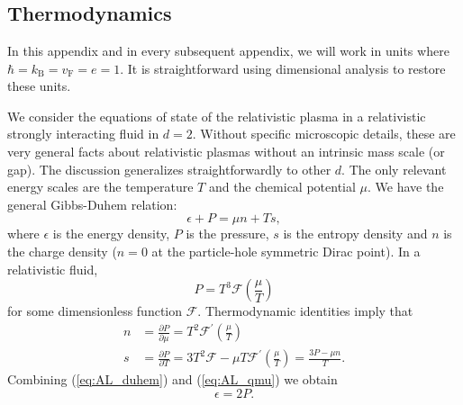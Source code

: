 \chapter{}
\label{Appendix}
\section{Thermodynamics}\label{appthermo}
In this appendix and in every subsequent appendix, we will work in units where $\hbar=k_{\mathrm{B}}=v_{\mathrm{F}}=e=1$.     It is straightforward using dimensional analysis to restore these units.  

We consider the equations of state of the relativistic plasma in a relativistic strongly interacting fluid in $d=2$.    Without specific microscopic details, these are very general facts about relativistic plasmas without an intrinsic mass scale (or gap).  The discussion generalizes straightforwardly to other $d$.    The only relevant energy scales are the temperature $T$ and the chemical potential $\mu$.     We have the general Gibbs-Duhem relation:\begin{equation} \label{eq:AL_duhem}
\epsilon + P = \mu n + Ts,
\end{equation}where $\epsilon$ is the energy density, $P$ is the pressure, $s$ is the entropy density and $n$ is the charge density ($n=0$ at the particle-hole symmetric Dirac point).   In a relativistic fluid, \begin{equation}
P  = T^3 \mathcal{F}\left(\frac{\mu}{T}\right)
\end{equation}for some dimensionless function $\mathcal{F}$.  Thermodynamic identities imply that \begin{subequations} \label{eq:AL_qmu}\begin{align}
n &= \frac{\partial P}{\partial \mu} = T^2 \mathcal{F}^\prime \left(\frac{\mu}{T}\right) \\
s &= \frac{\partial P}{\partial T} = 3T^2 \mathcal{F} -  \mu T\mathcal{F}^\prime \left(\frac{\mu}{T}\right) = \frac{3P - \mu n }{T}.
\end{align}\end{subequations}Combining (\ref{eq:AL_duhem}) and (\ref{eq:AL_qmu}) we obtain \begin{equation}
\epsilon = 2P.
\end{equation}

